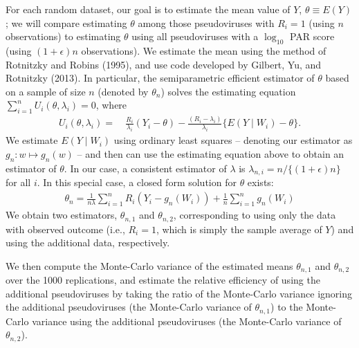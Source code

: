 \documentclass[10pt]{article}
\begin{document}
For each random dataset, our goal is to estimate the mean value of $Y$, $\theta \equiv E(Y)$; we will compare estimating $\theta$ among those pseudoviruses with $R_i = 1$ (using $n$ observations) to estimating $\theta$ using all pseudoviruses with a $\log_{10}$ PAR score (using $(1+\epsilon)n$ observations). We estimate the mean using the method of Rotnitzky and Robins (1995), and use code developed by Gilbert, Yu, and Rotnitzky (2013). In particular, the semiparametric efficient estimator of $\theta$ based on a sample of size $n$ (denoted by $\theta_n$) solves the estimating equation $\sum_{i=1}^n U_i(\theta, \lambda_i) = 0$, where
\begin{align*}
    U_i(\theta, \lambda_i) =& \ \frac{R_i}{\lambda_i}(Y_i - \theta) - \frac{(R_i - \lambda_i)}{\lambda_i}\{E(Y \mid W_i) - \theta\}.
\end{align*}
We estimate $E(Y \mid W_i)$ using ordinary least squares -- denoting our estimator as $g_n: w \mapsto g_n(w)$ -- and then can use the estimating equation above to obtain an estimator of $\theta$. In our case, a consistent estimator of $\lambda$ is $\lambda_{n,i} = n / \{(1 + \epsilon)n\}$ for all $i$. In this special case, a closed form solution for $\theta$ exists:
\begin{align*}
    \theta_n = \frac{1}{n\lambda}\sum_{i=1}^nR_i(Y_i - g_n(W_i)) + \frac{1}{n}\sum_{i=1}^n g_n(W_i)
\end{align*}
 We obtain two estimators, $\theta_{n,1}$ and $\theta_{n,2}$, corresponding to using only the data with observed outcome (i.e., $R_i = 1$, which is simply the sample average of $Y$) and using the additional data, respectively.

We then compute the Monte-Carlo variance of the estimated means $\theta_{n,1}$ and $\theta_{n,2}$ over the 1000 replications, and estimate the relative efficiency of using the additional pseudoviruses by taking the ratio of the Monte-Carlo variance ignoring the additional pseudoviruses (the Monte-Carlo variance of $\theta_{n,1}$) to the Monte-Carlo variance using the additional pseudoviruses (the Monte-Carlo variance of $\theta_{n,2}$).
\end{document}
